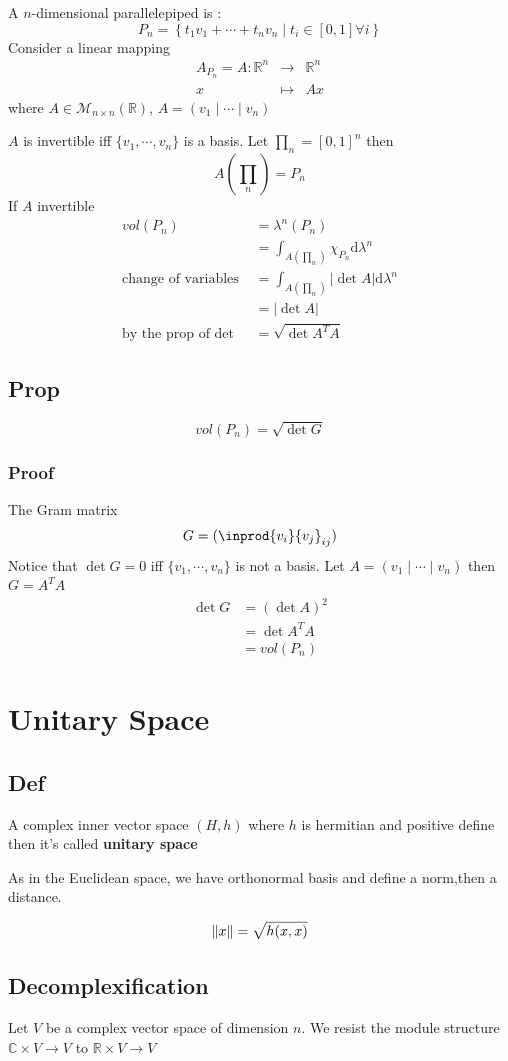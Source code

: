 \documentclass{book}
\newcommand{\abs}[1]{\left\lvert #1 \right\rvert}
\begin{document}
A $n$-dimensional parallelepiped is :
$$P_n=\left\{t_1v_1+\cdots+t_nv_n\mid t_i\in[0,1]\forall i\right\}$$
Consider a linear mapping
$$\begin{aligned}
    A_{P_n}=A:\mathbb{R}^n&\rightarrow&\mathbb{R}^n\\x&\mapsto&Ax
\end{aligned}$$
where $A\in\mathcal{M}_{n\times n}(\mathbb{R})$, $A=(v_1\mid\cdots\mid v_n)$

$A$ is invertible iff $\{v_1,\cdots,v_n\}$ is a basis. Let $\prod_n=[0,1]^n$ then$$A(\prod_n)=P_n$$
If $A$ invertible
$$\begin{aligned}
    vol(P_n)&=\lambda^n(P_n)\\
    &=\int_{A(\prod_n)}\chi_{P_n}\text{d}\lambda^n\\
    \text{change of variables }&=\int_{A(\prod_n)}\abs{\det A}\text{d}\lambda^n\\
    &=\abs{\det A}\\
    \text{by the prop of det }&=\sqrt{\det A^TA}
\end{aligned}$$
\section{Prop}
$$vol(P_n)=\sqrt{\det G}$$
\subsection*{Proof}
The Gram matrix$$G=(\inprod{v_i}{v_j}_{ij})$$
Notice that $\det G=0$ iff $\{v_1,\cdots,v_n\}$ is not a basis. Let $A=(v_1\mid\cdots\mid v_n)$ then $G=A^TA$
$$\begin{aligned}
    \det G&=(\det A)^2\\
    &=\det A^TA\\
    &=vol(P_n)
\end{aligned}$$
\chapter{Unitary Space}
\section{Def}
A complex inner vector space $(H,h)$ where $h$ is hermitian and positive define then it's called \textbf{unitary space}

As in the Euclidean space, we have orthonormal basis and define a norm,then a distance.

$$\left\lVert x \right\rVert=\sqrt{h(x,x)}$$
\section{Decomplexification}
Let $V$ be a complex vector space of dimension $n$. We resist the module structure $\mathbb{C}\times V\rightarrow V$ to $\mathbb{R}\times V\rightarrow V$
\end{document}
